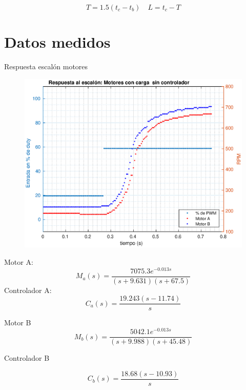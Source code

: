 \documentclass[10pt,conference,a4paper,onecolumn]{article}%
\begin{document}
\begin{equation}
T=1.5(t_c -t_b) \quad	L=t_c-T
\label{eq:calculo_T_L}
\end{equation}




\section{Datos medidos}
Respuesta escalón motores


\begin{figure}[h]
\centering
\includegraphics[width=15cm]{./imagenes/resp_escalon_motores_2}
\end{figure}
Motor A:
\begin{equation}
M_a(s)= \frac{7075.3 e^{-0.013s}}{(s+9.631)(s+67.5)}
\end{equation}
Controlador A:
\begin{equation}
C_a(s)= \frac{  19.243 (s-11.74)}{s}
\end{equation}


Motor B
\begin{equation}
M_b(s)= \frac{5042.1 e^{-0.013s}}{(s+9.988) (s+45.48)}
\end{equation}

Controlador B

\begin{equation}
C_b(s)= \frac{ 18.68 (s-10.93)}{s}
\end{equation}
\end{document}
